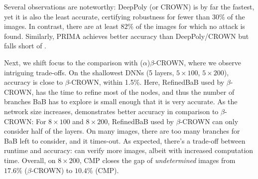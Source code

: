 Several observations are noteworthy: DeepPoly (or CROWN) is by far the fastest, yet it is also the least accurate, certifying robustness for fewer than $30\%$ of the images. In contrast, there are at least $82\%$ of the images for which no attack is found. Similarly, PRIMA achieves better accuracy than DeepPoly/CROWN but falls short of \toolname. 

Next, we shift focus to the comparison with ($\alpha$)$\beta$-CROWN, where we observe intriguing trade-offs. On the shallowest DNNs (5 layers, $5 \times 100$, $5 \times 200$), \toolname accuracy is close to $\beta$-CROWN, within 1.5\%. Here, RefinedBaB used by $\beta$-CROWN, has the time to refine most of the nodes, and thus the number of branches BaB has to explore is small enough that it is very accurate.
As the network size increases, \toolname demonstrates better accuracy in comparison to $\beta$-CROWN: For $8 \times 100$ and $8 \times 200$, 
RefinedBaB used by $\beta$-CROWN can only consider half of the layers. 
On many images, there are too many branches for BaB left to consider, and it times-out.
As expected, there's a trade-off between runtime and accuracy: \toolname can verify more images, albeit with increased computation time. Overall, on $8 \times 200$, CMP closes the gap of {\em undetermined} images from $17.6\%$ ($\beta$-CROWN) to $10.4\%$ (CMP).


